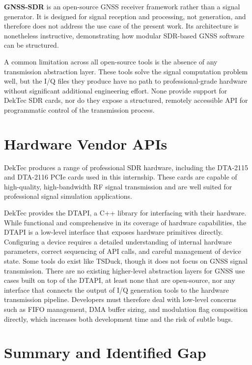 \textbf{GNSS-SDR} \cite{gnssSdr} is an open-source \gls{GNSS} receiver framework rather than a signal generator. It is designed for signal reception and processing, not generation, and therefore does not address the use case of the present work. Its architecture is nonetheless instructive, demonstrating how modular \gls{SDR}-based \gls{GNSS} software can be structured.

A common limitation across all open-source tools is the absence of any
transmission abstraction layer. These tools solve the signal computation
problem well, but the \gls{I/Q} files they produce have no path to
professional-grade hardware without significant additional engineering effort.
None provide support for DekTec \gls{SDR} cards, nor do they expose a
structured, remotely accessible API for programmatic control of the
transmission process.

\section{Hardware Vendor APIs}

DekTec produces a range of professional \gls{SDR} hardware, including the
DTA-2115 and DTA-2116 PCIe cards used in this internship. These cards are
capable of high-quality, high-bandwidth \gls{RF} signal transmission and are
well suited for professional signal simulation applications.

DekTec provides the \gls{DTAPI}, a C++ library for interfacing with their
hardware. While functional and comprehensive in its coverage of hardware
capabilities, the \gls{DTAPI} is a low-level interface that exposes hardware
primitives directly. Configuring a device requires a detailed understanding of
internal hardware parameters, correct sequencing of API calls, and careful
management of device state. Some tools do exist like TSDuck\cite{ts-duck},
though it does not focus on \gls{GNSS} signal transmission. There are no
existing higher-level abstraction layers for \gls{GNSS} use cases built on top
of the \gls{DTAPI}, at least none that are open-source, nor any interface that
connects the output of \gls{I/Q} generation tools to the hardware transmission
pipeline. Developers must therefore deal with low-level concerns such as FIFO
management, DMA buffer sizing, and modulation flag composition directly, which
increases both development time and the risk of subtle bugs.

\section{Summary and Identified Gap}

